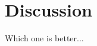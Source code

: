 \documentclass[12pt,fleqn]{article}
\begin{document}
\begin{comment}
	Results of using baysian optimization with acquisition LCB: \\
	${hidden units: 3300, p: 0.20745359704991084, activation func: ReLU(), validation loss: 0.619}$
	${hidden units: 2900, p: 0.48178037973857923, activation func: Sigmoid(), validation loss: 0.6355}$
	${hidden units: 1700, p: 0.37725127529617486, activation func: ReLU6(), validation loss: 0.5955}$
	${hidden units: 3400, p: 0.5452219321218295, activation func: Sigmoid(), validation loss: 0.6275}$
	${hidden units: 1800, p: 0.47970862684081317, activation func: ReLU(), validation loss: 0.613}$
	${hidden units: 2900, p: 0.4817801130255398, activation func: Sigmoid(), validation loss: 0.634}$
	${hidden units: 2900, p: 0.4891192307830994, activation func: Sigmoid(), validation loss: 0.642}$
	${hidden units: 2900, p: 0.4947118739255611, activation func: Sigmoid(), validation loss: 0.6365}$
	${hidden units: 2900, p: 0.5834934845352279, activation func: Sigmoid(), validation loss: 0.651}$
	${hidden units: 2900, p: 0.6168247073529851, activation func: Sigmoid(), validation loss: 0.6365}$
	${hidden units: 2900, p: 1, activation func: Sigmoid(), validation loss: 0.0965}$
	${hidden units: 2900, p: 0.5604663271240786, activation func: Sigmoid(), validation loss: 0.635}$
	${hidden units: 2900, p: 0.5094736622953687, activation func: Sigmoid(), validation loss: 0.638}$
	${hidden units: 2900, p: 0.5849237064289087, activation func: Sigmoid(), validation loss: 0.629}$
	${hidden units: 2900, p: 0.5765931111057664, activation func: Sigmoid(), validation loss: 0.6265}$
	$bedste:  [2.90000000e+03 5.83493485e-01 3.00000000e+00]$	
\end{comment}

\begin{comment}
	{'hidden_units': 100, 'p': 0.33, 'activation_func': Sigmoid()}
	0.6345000000000001
	
	{'hidden_units': 100, 'p': 0.33, 'activation_func': Sigmoid()}
	0.6405
	
	{'hidden_units': 100, 'p': 0.66, 'activation_func': ReLU()}
	0.515
	
	{'hidden_units': 100, 'p': 0.66, 'activation_func': Sigmoid()}
	0.561
	
	{'hidden_units': 2000, 'p': 0.33, 'activation_func': Tanh()}
	0.513
	
	{'hidden_units': 2000, 'p': 0.33, 'activation_func': ReLU()}
	0.649
	
	{'hidden_units': 2000, 'p': 0.66, 'activation_func': Sigmoid()}
	0.6525
	
	{'hidden_units': 2000, 'p': 0.66, 'activation_func': ReLU6()}
	0.5685
	
	{'hidden_units': 4000, 'p': 0.33, 'activation_func': Tanh()}
	0.5595
	
	{'hidden_units': 4000, 'p': 0.33, 'activation_func': ReLU6()}
	0.5345
	
	{'hidden_units': 4000, 'p': 0.66, 'activation_func': ReLU6()}
	0.5015000000000001
	
	{'hidden_units': 4000, 'p': 0.66, 'activation_func': Tanh()}
	0.505
	
\end{comment}

\section{Discussion}
Which one is better...
\end{document}
